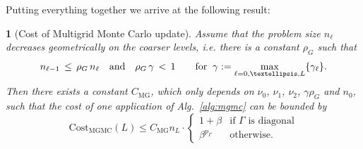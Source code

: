 \documentclass[11pt,english]{article}
\theoremstyle{plain}
\newtheorem{thm}{\protect\theoremname}[section]
\theoremstyle{plain}
\theoremstyle{plain}
\theoremstyle{plain}
\numberwithin{equation}{section}
\newcommand{\rev}[1]{#1}
\providecommand{\theoremname}{Theorem}
\begin{document}
Putting everything together we arrive at the following result:
\begin{thm}[Cost of Multigrid Monte Carlo update]
    \label{thm:mgmc_cost}
    Assume that the problem size $n_{\ell}$ decreases geometrically on the coarser levels, i.e. there is a constant $\rho_G$ such that
    \begin{equation}
        n_{\ell-1}\, \le\, \rho_G\, n_\ell\quad\text{and}\quad \rho_G\, \gamma \,<\, 1
        \qquad\text{for\;\;$\gamma:=\max_{\ell=0,\dots,L}\{\gamma_\ell\}$}
        \label{eqn:dim-decrease}.
    \end{equation}
    Then there exists a constant $C_{\mathrm{MG}}$, which only depends on $\nu_0$, $\nu_1$, $\nu_2$, $\gamma\rho_G$ and $n_0$, such that the cost of one application of Alg.~\ref{alg:mgmc} can be bounded by
    \begin{equation}
        \mathrm{Cost}_{\mathrm{MGMC}}(L) \le 
        C_{\mathrm{MG}}  n_L\cdot \begin{cases}
        1+\beta & \text{if $\Gamma$ is diagonal}\\
        \rev{\beta^{p_\Gamma}} & \text{otherwise}.
        \end{cases}
        \label{eqn:cost_thm}
    \end{equation}
\end{thm}
\end{document}
